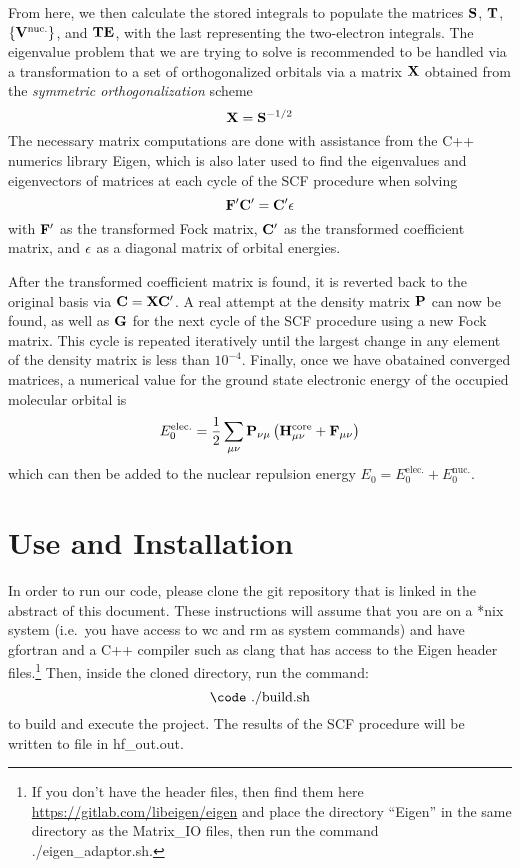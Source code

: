 \documentclass[%
 aip,
 amsmath,amssymb,
 reprint,%
]{revtex4-1}
\begin{document}
From here, we then calculate the stored integrals to populate the matrices 
$\bold{S}$, $\bold{T}$, $\left\{\bold{V}^{\text{nuc.}}\right\}$, and $\bold{TE}$,
with the last representing the two-electron integrals. The eigenvalue problem
that we are trying to solve is recommended to be handled via a transformation
to a set of orthogonalized orbitals via a matrix $\bold{X}$ obtained from 
the \emph{symmetric orthogonalization} scheme
%
\begin{equation}
\bold{X} = \bold{S}^{-1/2}
\end{equation}
%
The necessary matrix computations are done with assistance from the C++
numerics library Eigen\cite{eigenweb}, which is also later used to find the 
eigenvalues and eigenvectors of matrices at each cycle of the SCF procedure
when solving 
\begin{equation}
\bold{F}'\bold{C}' = \bold{C'}\bold{\epsilon}
\end{equation}
with $\bold{F}'$ as the transformed Fock matrix, 
$\bold{C}'$ as the transformed coefficient matrix, and $\bold{\epsilon}$ as a
diagonal matrix of orbital energies.

After the transformed coefficient matrix is found, it is reverted back to the
original basis via $\bold{C} = \bold{X}\bold{C}'$. A real attempt at the density
matrix $\bold{P}$ can now be found, as well as $\bold{G}$ for the next cycle
of the SCF procedure using a new Fock matrix.  This cycle is repeated
iteratively until the largest change in any element of the density matrix is
less than $10^{-4}$.  Finally, once we have obatained converged matrices, a
numerical value for the ground state electronic energy of the occupied
molecular orbital is
\begin{equation}
E_0^{\text{elec.}} = \frac{1}{2} \sum_{\mu\nu} \bold{P}_{\nu\mu} \left(
\bold{H}_{\mu\nu}^{\text{core}} + \bold{F}_{\mu\nu} \right)
\end{equation}
which can then be added to the nuclear repulsion energy 
$E_0 = E_0^{\text{elec.}} + E_0^{\text{nuc.}}$.



\section{Use and Installation}
In order to run our code, please clone the git repository that is linked in
the abstract of this document. These instructions will assume that you are
on a *nix system (i.e.\ you have access to {\code wc} and {\code rm} as
system commands) and have {\code gfortran} and a C++ compiler such as 
{\code clang} that has access to the Eigen header files.\footnote{If you don't
have the header files, then find them here \\
\protect\url{https://gitlab.com/libeigen/eigen} and place the directory ``Eigen'' in
the same directory as the Matrix\_IO files, then run the command {\code
./eigen\_adaptor.sh}.} Then, inside the
cloned directory, run the command: 
%
$$ \text{{\code ./build.sh}} $$
to build and execute the project. The results of the SCF procedure will be
written to file in {\code hf\_out.out}.
\end{document}
